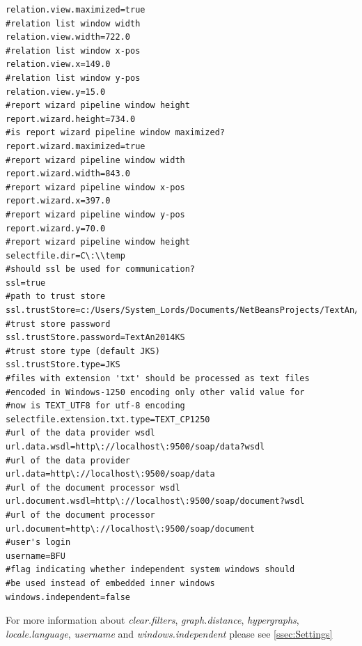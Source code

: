 \documentclass[12pt,a4paper]{report}
\begin{document}
\begin{lstlisting}[frame=single,language=properties]
relation.view.maximized=true
#relation list window width
relation.view.width=722.0
#relation list window x-pos
relation.view.x=149.0
#relation list window y-pos
relation.view.y=15.0
#report wizard pipeline window height
report.wizard.height=734.0
#is report wizard pipeline window maximized?
report.wizard.maximized=true
#report wizard pipeline window width
report.wizard.width=843.0
#report wizard pipeline window x-pos
report.wizard.x=397.0
#report wizard pipeline window y-pos
report.wizard.y=70.0
#report wizard pipeline window height
selectfile.dir=C\:\\temp
#should ssl be used for communication?
ssl=true
#path to trust store
ssl.trustStore=c:/Users/System_Lords/Documents/NetBeansProjects/TextAn/Client/myTrustStore.localhost
#trust store password
ssl.trustStore.password=TextAn2014KS
#trust store type (default JKS)
ssl.trustStore.type=JKS
#files with extension 'txt' should be processed as text files
#encoded in Windows-1250 encoding only other valid value for
#now is TEXT_UTF8 for utf-8 encoding
selectfile.extension.txt.type=TEXT_CP1250
#url of the data provider wsdl
url.data.wsdl=http\://localhost\:9500/soap/data?wsdl
#url of the data provider
url.data=http\://localhost\:9500/soap/data
#url of the document processor wsdl
url.document.wsdl=http\://localhost\:9500/soap/document?wsdl
#url of the document processor
url.document=http\://localhost\:9500/soap/document
#user's login
username=BFU
#flag indicating whether independent system windows should
#be used instead of embedded inner windows
windows.independent=false
\end{lstlisting}

For more information about \emph{clear.filters}, \emph{graph.distance},
\emph{hypergraphs}, \emph{locale.language}, \emph{username}
and \emph{windows.independent} please see \ref{ssec:Settings}
\end{document}
